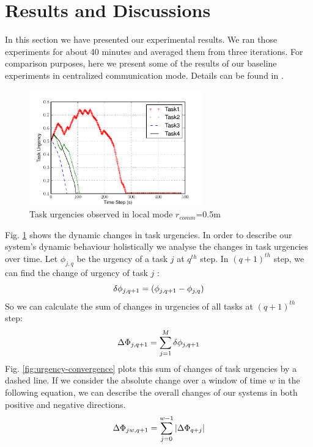 \documentclass[letterpaper, 10 pt, times, conference]{ieeeconf} %
\begin{document}
\section{Results and Discussions}
\label{sec:results}
In this section we have presented our experimental results. We ran those experiments for about 40 minutes and averaged them from three iterations. For comparison purposes, here we present some of the results of our baseline experiments in centralized communication mode. Details can be found in \cite{Sarker}.\\
\begin{figure}
\centering
\includegraphics[height=5cm]
{images/local-500cm/PlotUrgencyLog-2010Feb15-171017}
\caption{\small Task urgencies observed in local mode $r_{comm}$=0.5m}
\label{fig:raw-urgencies} %
\end{figure}
Fig. \ref{fig:raw-urgencies} shows the dynamic changes in task urgencies.
In order to describe our system's dynamic behaviour holistically we analyse the changes in task urgencies over time. Let $ \phi_{j, q}$ be the urgency of a task $j$ at $q^{th}$ step. In $(q+1)^{th}$ step, we can find the change of urgency of task $j$ :\\
\begin{equation} 
\small
\delta \phi_{j, q+1} = ( \phi_{j, q+1} - \phi_{j, q}) 
\end{equation}
So we can calculate the sum of changes in urgencies of all tasks at $(q+1)^{th}$ step:
\begin{equation} 
\small
\Delta \Phi_{j, q+1} = \sum_{j=1}^{M} \delta \phi_{j, q+1} 
\label{eqn:Delta-Phi}
\end{equation}
Fig. \ref{fig:urgency-convergence} plots this sum of changes of task urgencies by a dashed line. If we consider the absolute change over a window of time $w$ in the following equation, we can describe the overall changes of our systems in both positive and negative directions.
%
\begin{equation}
\small
\Delta \Phi_{jw, q+1} = \sum_{j=0}^{w-1} \left | \Delta \Phi_{q+j} \right |
\end{equation}
\end{document}
